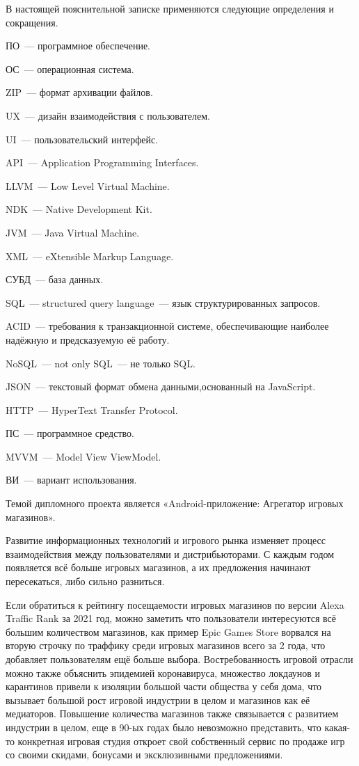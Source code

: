 \setcounter{page}{6}
\setlength{\parindent}{0ex}
В настоящей пояснительной записке применяются следующие определения и сокращения.

ПО~--- программное обеспечение.

ОС~--- операционная система.

ZIP~--- формат архивации файлов.

UX~--- дизайн взаимодействия с пользователем.

UI~--- пользовательский интерфейс.

API~--- Application Programming Interfaces.

LLVM~--- Low Level Virtual Machine.

NDK~--- Native Development Kit.

JVM~--- Java Virtual Machine.

XML~--- eXtensible Markup Language.

СУБД~--- база данных.

SQL~--- structured query language~--- язык структурированных запросов.

ACID~--- требования к транзакционной системе, обеспечивающие наиболее надёжную и предсказуемую её работу.

NoSQL~--- not only SQL~--- не только SQL.

JSON~--- текстовый формат обмена данными,основанный на JavaScript.

HTTP~--- HyperText Transfer Protocol.

ПС~--- программное средство.

MVVM~--- Model View ViewModel.

ВИ~--- вариант использования.
\setlength{\parindent}{\fivecharsapprox}
\newpage


\label{sec:intro}

Темой дипломного проекта является «Android-приложение: Агрегатор игровых магазинов».

Развитие информационных технологий и игрового рынка изменяет процесс взаимодействия между пользователями и дистрибьюторами. С каждым годом появляется всё больше игровых магазинов, а их предложения начинают пересекаться, либо сильно разниться. 

Если обратиться к рейтингу посещаемости игровых магазинов по версии Alexa Traffic Rank \cite{web0} за 2021 год, можно заметить что пользователи интересуются всё большим количеством магазинов, как пример Epic Games Store ворвался на вторую строчку по траффику среди игровых магазинов всего за 2 года, что добавляет пользователям ещё больше выбора.
Востребованность игровой отрасли можно также объяснить эпидемией коронавируса, множество локдаунов и карантинов привели к изоляции большой части общества у себя дома, что вызывает большой рост игровой индустрии в целом и магазинов как её медиаторов.
Повышение количества магазинов также связывается с развитием индустрии в целом, еще в 90-ых годах было невозможно представить, что какая-то конкретная игровая студия откроет свой собственный сервис по продаже игр со своими скидами, бонусами и эксклюзивными предложениями.

